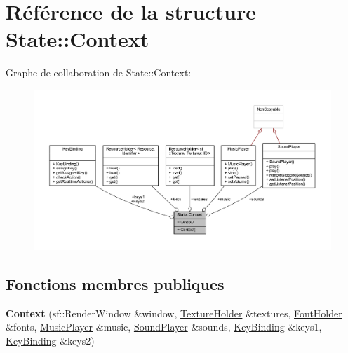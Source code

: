 \hypertarget{struct_state_1_1_context}{}\section{Référence de la structure State\+:\+:Context}
\label{struct_state_1_1_context}


Graphe de collaboration de State\+:\+:Context\+:\nopagebreak
\begin{figure}[H]
\begin{center}
\leavevmode
\includegraphics[width=350pt]{struct_state_1_1_context__coll__graph}
\end{center}
\end{figure}
\subsection*{Fonctions membres publiques}
\begin{DoxyCompactItemize}
\item 
\hypertarget{struct_state_1_1_context_a94631ecf6f359cb4d63cc3f874a6f1eb}{}\label{struct_state_1_1_context_a94631ecf6f359cb4d63cc3f874a6f1eb} 
{\bfseries Context} (sf\+::\+Render\+Window \&window, \hyperlink{class_resource_holder}{Texture\+Holder} \&textures, \hyperlink{class_resource_holder}{Font\+Holder} \&fonts, \hyperlink{class_music_player}{Music\+Player} \&music, \hyperlink{class_sound_player}{Sound\+Player} \&sounds, \hyperlink{class_key_binding}{Key\+Binding} \&keys1, \hyperlink{class_key_binding}{Key\+Binding} \&keys2)
\end{DoxyCompactItemize}
